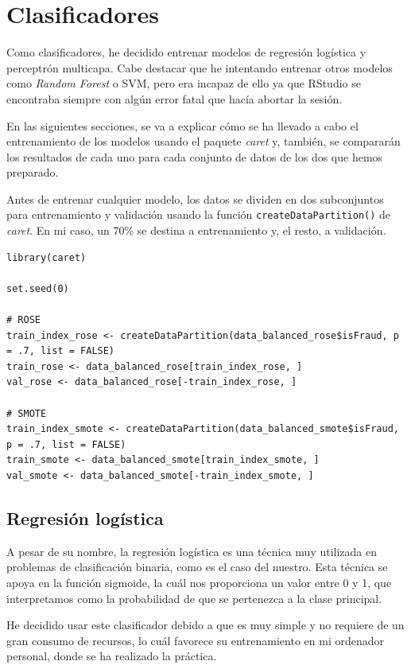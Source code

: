 \section{Clasificadores}
Como clasificadores, he decidido entrenar modelos de regresión logística y
perceptrón multicapa. Cabe destacar que he intentando entrenar otros modelos
como \textit{Random Forest} o SVM, pero era incapaz de ello ya que RStudio se
encontraba siempre con algún error fatal que hacía abortar la sesión.

En las siguientes secciones, se va a explicar cómo se ha llevado a cabo el
entrenamiento de los modelos usando el paquete \textit{caret} y, también, se
compararán los resultados de cada uno para cada conjunto de datos de los dos que
hemos preparado.

Antes de entrenar cualquier modelo, los datos se dividen en dos subconjuntos
para entrenamiento y validación usando la función
\lstinline{createDataPartition()} de \textit{caret}. En mi caso, un 70\% se
destina a entrenamiento y, el resto, a validación.

\begin{lstlisting}
library(caret)

set.seed(0)

# ROSE
train_index_rose <- createDataPartition(data_balanced_rose$isFraud, p = .7, list = FALSE)
train_rose <- data_balanced_rose[train_index_rose, ]
val_rose <- data_balanced_rose[-train_index_rose, ]

# SMOTE
train_index_smote <- createDataPartition(data_balanced_smote$isFraud, p = .7, list = FALSE)
train_smote <- data_balanced_smote[train_index_smote, ]
val_smote <- data_balanced_smote[-train_index_smote, ]
\end{lstlisting}

\subsection{Regresión logística}
A pesar de su nombre, la regresión logística es una técnica muy utilizada en
problemas de clasificación binaria, como es el caso del nuestro. Esta técnica se
apoya en la función sigmoide, la cuál nos proporciona un valor entre 0 y 1, que
interpretamos como la probabilidad de que se pertenezca a la clase principal.

He decidido usar este clasificador debido a que es muy simple y no requiere de
un gran consumo de recursos, lo cuál favorece su entrenamiento en mi ordenador
personal, donde se ha realizado la práctica.

